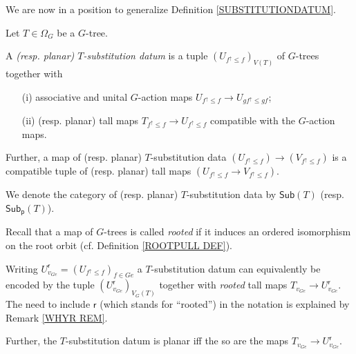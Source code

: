 \documentclass[a4paper,10pt]{article}%
\begin{document}
We are now in a position to generalize 
Definition \ref{SUBSTITUTIONDATUM}.

\begin{definition}\label{SUBSTITUTIONDATUMG DEF}
	Let $T \in \Omega_G$ be a $G$-tree.
	
	A \textit{(resp. planar) $T$-substitution datum} is a tuple 
	$\left(U_{f^{\uparrow} \leq f} \right)_{V(T)}$ of $G$-trees together with
\begin{itemize}	
\item[(i)] associative and unital $G$-action maps
$U_{f^{\uparrow} \leq f} \to U_{g f^{\uparrow} \leq g f}$; 
\item[(ii)]	(resp. planar) tall maps 
	$T_{f^{\uparrow} \leq f} \to U_{f^{\uparrow} \leq f}$ compatible with the $G$-action maps.
\end{itemize}	
	Further, a map of (resp. planar) $T$-substitution data 
	$\left(U_{f^{\uparrow} \leq f}\right) \to
	\left(V_{f^{\uparrow} \leq f}\right)$ is a compatible tuple of (resp. planar) tall maps 
	$\left(U_{f^{\uparrow} \leq f} \to V_{f^{\uparrow} \leq f} \right)$.
	
	We denote the category of (resp. planar) $T$-substitution data 
	by $\mathsf{Sub}(T)$
	(resp. $\mathsf{Sub}_{\mathsf{p}}(T)$).
\end{definition}


Recall that a map of $G$-trees is called 
\textit{rooted} if it induces an ordered isomorphism on the root orbit (cf. Definition \ref{ROOTPULL DEF}).

\begin{remark}\label{SUBSGREF DEF}
Writing $U^{\mathsf{r}}_{v_{G e}} = (U_{f^{\uparrow} \leq f})_{f \in Ge}$
a $T$-substitution datum can equivalently be encoded by the tuple
$\left(U^{\mathsf{r}}_{v_{G e}}\right)_{V_G(T)}$ together with \textit{rooted} tall maps 
$T_{v_{Ge}} \to U^{\mathsf{r}}_{v_{G e}}$.
The need to include $\mathsf{r}$ (which stands for ``rooted'')
in the notation is explained by Remark \ref{WHYR REM}.

Further, the $T$-substitution datum is planar iff the so are the maps $T_{v_{Ge}} \to U^{\mathsf{r}}_{v_{G e}}$.
\end{remark}
\end{document}
